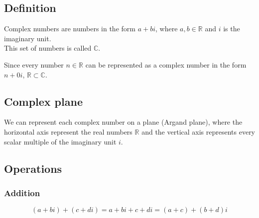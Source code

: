\documentclass{article}
\begin{document}
\subsection{Definition}

Complex numbers are numbers in the form \(a + bi\),
where \(a,b\in\mathbb{R}\) and \(i\) is the imaginary unit.
\\
This set of numbers is called \(\mathbb{C}\).

Since every number \(n\in\mathbb{R}\) can be represented as
a complex number in the form \(n+0i\), \(\mathbb{R}\subset\mathbb{C}\).

\subsection{Complex plane}

We can represent each complex number on a plane (Argand plane), where the horizontal axis
represent the real numbers \(\mathbb{R}\) and the vertical axis represents
every scalar multiple of the imaginary unit \(i\).

\begin{center}
\end{center}

\subsection{Operations}

\subsubsection{Addition}
\[
    (a+bi)+(c+di)=a+bi+c+di=(a+c)+(b+d)i
\]
\end{document}
